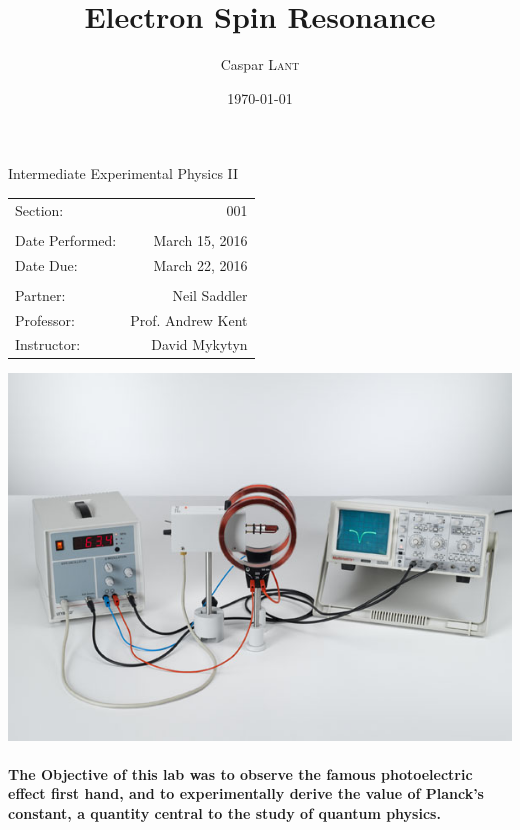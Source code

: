 \documentclass{amsart}
\title{Electron Spin Resonance}
\author{Caspar \textsc{Lant}} %
\date{\today} %
\begin{document}
\bigskip

\maketitle %
\begin{center}

Intermediate Experimental Physics II\\
\vspace{1.5cm}

\begin{tabular}{l r}

Section: & 001\\
\\
Date Performed: & March 15, 2016 \\ %
Date Due: & March 22, 2016\\
\\
Partner: & Neil Saddler\\ %
Professor: & Prof. Andrew Kent\\
Instructor: & David Mykytyn %
\end{tabular}
\vfill
\includegraphics[width=.7\textwidth]{diagram.jpg}
\end{center}
\vfill
\pagebreak

\paragraph{\textbf{The Objective} of this lab was to observe the famous photoelectric effect first hand, and to experimentally derive the value of Planck's constant, a quantity central to the study of quantum physics.   }
\end{document}
